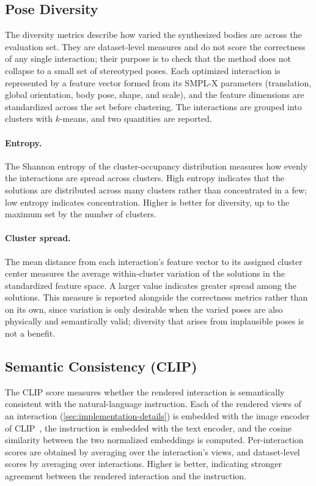 \subsection{Pose Diversity}
\label{sec:exp-metrics-diversity}

The diversity metrics describe how varied the synthesized bodies are across the evaluation set. They are dataset-level measures and do not score the correctness of any single interaction; their purpose is to check that the method does not collapse to a small set of stereotyped poses. Each optimized interaction is represented by a feature vector formed from its SMPL-X parameters (translation, global orientation, body pose, shape, and scale), and the feature dimensions are standardized across the set before clustering. The interactions are grouped into clusters with $k$-means, and two quantities are reported.

\paragraph{Entropy.} The Shannon entropy of the cluster-occupancy distribution measures how evenly the interactions are spread across clusters. High entropy indicates that the solutions are distributed across many clusters rather than concentrated in a few; low entropy indicates concentration. Higher is better for diversity, up to the maximum set by the number of clusters.

\paragraph{Cluster spread.} The mean distance from each interaction's feature vector to its assigned cluster center measures the average within-cluster variation of the solutions in the standardized feature space. A larger value indicates greater spread among the solutions. This measure is reported alongside the correctness metrics rather than on its own, since variation is only desirable when the varied poses are also physically and semantically valid; diversity that arises from implausible poses is not a benefit.

\subsection{Semantic Consistency (CLIP)}
\label{sec:exp-metrics-clip}

The CLIP score measures whether the rendered interaction is semantically consistent with the natural-language instruction. Each of the rendered views of an interaction (\cref{sec:implementation-details}) is embedded with the image encoder of CLIP~\cite{radford2021clip}, the instruction is embedded with the text encoder, and the cosine similarity between the two normalized embeddings is computed. Per-interaction scores are obtained by averaging over the interaction's views, and dataset-level scores by averaging over interactions. Higher is better, indicating stronger agreement between the rendered interaction and the instruction.

